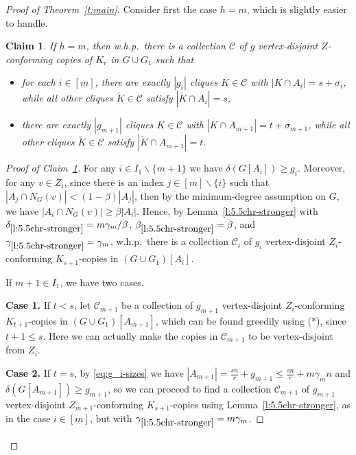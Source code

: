 \documentclass[reqno, 12pt]{amsart}
\numberwithin{equation}{section}
\numberwithin{figure}{section}
\theoremstyle{plain}
\newtheorem{claim}[thm]{Claim}
\theoremstyle{definition}
\def\cC{{\mathcal C}}
\let\setminus=\smallsetminus
\begin{document}
\begin{proof}[Proof of Theorem~\ref{t:main}]
    \smallskip
    Consider first the case $h=m$, which is slightly easier to handle. 
    
    \begin{claim}
        \label{c:size-adj}
        If $h=m$, then w.h.p.~there is a collection $\cC$ of $g$ vertex-disjoint $Z$-conforming copies of $K_r$ in $G\cup G_1$ such that 
        \begin{itemize}
            \item for each $i\in [m]$, there are exactly $|g_i|$ cliques $K\in \cC$ with $|K\cap A_i|=s+\sigma_i$, while all other cliques $\tilde K\in \cC$ satisfy $|\tilde K\cap A_i|= s$,
            \item there are exactly $|g_{m+1}|$ cliques $K\in \cC$ with $|K\cap A_{m+1}|=t+\sigma_{m+1}$, while all other cliques $\tilde K\in\cC$ satisfy $|\tilde K\cap A_{m+1}|=t$.
        \end{itemize}
    \end{claim}
    
    \begin{proof}[Proof of Claim~\ref{c:size-adj}] 
        For any $i\in I_1\setminus\{m+1\}$ we have $\delta (G[A_i])\geq g_i$. Moreover, for any $v\in Z_i$, since there is an index $j\in [m]\setminus\{i\}$ such that $|A_j\cap N_G(v)|< (1-\beta) |A_j|$, then by the minimum-degree assumption on $G$, we have $|A_i\cap N_G(v)|\geq \beta |A_i|$. Hence, by Lemma~\ref{l:5.5chr-stronger} with $\delta_{\ref{l:5.5chr-stronger}}=m\gamma_m/\beta$, $\beta_{\ref{l:5.5chr-stronger}}=\beta$, and $\gamma_{\ref{l:5.5chr-stronger}}=\gamma_m$, w.h.p.~there is a collection $\cC_i$ of $g_i$ vertex-disjoint $Z_i$-conforming $K_{s+1}$-copies in $(G \cup G_1)[A_i]$. %
        
        If $m+1\in I_1$, we have two cases.
        
        \textbf{Case 1.} If $t<s$, let $\cC_{m+1}$ be a collection of $g_{m+1}$ vertex-disjoint $Z_i$-conforming $K_{t+1}$-copies in $(G\cup G_1)[A_{m+1}]$, which can be found greedily using ($\ast$), since $t+1 \leq s$. Here we can actually make the copies in $\cC_{m+1}$ to be vertex-disjoint from $Z_i$.

        \textbf{Case 2.} If $t=s$, by \eqref{eq:g_i-sizes} we have $|A_{m+1}| = \frac{sn}{r}+g_{m+1} \leq \frac {sn}r + m\gamma_mn$ and $\delta(G[A_{m+1}])\geq g_{m+1}$, so we can proceed to find a collection $\cC_{m+1}$ of $g_{m+1}$ vertex-disjoint $Z_{m+1}$-conforming $K_{s+1}$-copies using Lemma~\ref{l:5.5chr-stronger}, as in the case $i\in [m]$, but with $\gamma_{\ref{l:5.5chr-stronger}}=m\gamma_m$.


\end{proof}
\end{proof}
\end{document}
